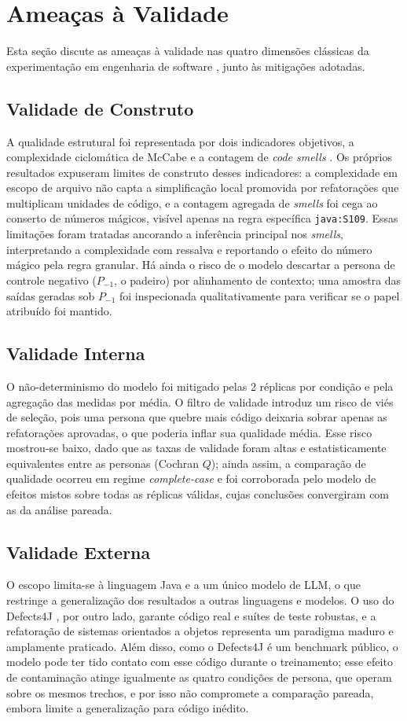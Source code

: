 \documentclass[10pt,conference,a4paper,twocolumn]{article}
\begin{document}
\section{Ameaças à Validade}
Esta seção discute as ameaças à validade nas quatro dimensões clássicas da experimentação em engenharia de software \cite{wohlin}, junto às mitigações adotadas.

\subsection{Validade de Construto}
A qualidade estrutural foi representada por dois indicadores objetivos, a complexidade ciclomática de McCabe \cite{mccabe1976} e a contagem de \textit{code smells} \cite{sonarqube}. Os próprios resultados expuseram limites de construto desses indicadores: a complexidade em escopo de arquivo não capta a simplificação local promovida por refatorações que multiplicam unidades de código, e a contagem agregada de \textit{smells} foi cega ao conserto de números mágicos, visível apenas na regra específica \texttt{java:S109}. Essas limitações foram tratadas ancorando a inferência principal nos \textit{smells}, interpretando a complexidade com ressalva e reportando o efeito do número mágico pela regra granular. Há ainda o risco de o modelo descartar a persona de controle negativo ($P_{-1}$, o padeiro) por alinhamento de contexto; uma amostra das saídas geradas sob $P_{-1}$ foi inspecionada qualitativamente para verificar se o papel atribuído foi mantido.

\subsection{Validade Interna}
O não-determinismo do modelo foi mitigado pelas 2 réplicas por condição e pela agregação das medidas por média. O filtro de validade introduz um risco de viés de seleção, pois uma persona que quebre mais código deixaria sobrar apenas as refatorações aprovadas, o que poderia inflar sua qualidade média. Esse risco mostrou-se baixo, dado que as taxas de validade foram altas e estatisticamente equivalentes entre as personas (Cochran $Q$); ainda assim, a comparação de qualidade ocorreu em regime \textit{complete-case} e foi corroborada pelo modelo de efeitos mistos sobre todas as réplicas válidas, cujas conclusões convergiram com as da análise pareada.

\subsection{Validade Externa}
O escopo limita-se à linguagem Java e a um único modelo de LLM, o que restringe a generalização dos resultados a outras linguagens e modelos. O uso do Defects4J \cite{defects4j}, por outro lado, garante código real e suítes de teste robustas, e a refatoração de sistemas orientados a objetos representa um paradigma maduro e amplamente praticado. Além disso, como o Defects4J é um benchmark público, o modelo pode ter tido contato com esse código durante o treinamento; esse efeito de contaminação atinge igualmente as quatro condições de persona, que operam sobre os mesmos trechos, e por isso não compromete a comparação pareada, embora limite a generalização para código inédito.
\end{document}
